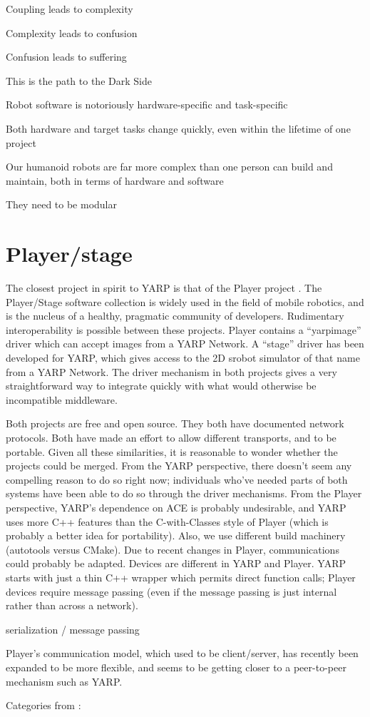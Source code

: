 Coupling leads to complexity

Complexity leads to confusion

Confusion leads to suffering

This is the path to the Dark Side

Robot software is notoriously hardware-specific and task-specific

Both hardware and target tasks change quickly, even within the
lifetime of one project

Our humanoid robots are far more complex than one person can build and
maintain, both in terms of hardware and software

They need to be modular



\section{Player/stage}

The closest project in spirit to YARP is that of the Player project
\cite{vaughan2006reusable}.  The Player/Stage software collection is 
widely used in the field of mobile robotics, and is the nucleus of
a healthy, pragmatic community of developers.  
%
Rudimentary interoperability is possible between these projects.
Player contains a ``yarpimage'' driver which can accept images
from a YARP Network.  A ``stage'' driver has been developed
for YARP, which gives access to the 2D srobot simulator of that
name from a YARP Network.
%
The driver mechanism in both projects gives a very straightforward way
to integrate quickly with what would otherwise be incompatible
middleware.

Both projects are free and open source.  They both have documented
network protocols.  Both have made an effort to allow different
transports, and to be portable.  Given all these similarities,
it is reasonable to wonder whether the projects could be merged.
%
From the YARP perspective, there doesn't seem any compelling reason to
do so right now; individuals who've needed parts of both systems have
been able to do so through the driver mechanisms.
%
From the Player perspective, YARP's dependence on ACE is probably
undesirable, and YARP uses more C++ features than the C-with-Classes
style of Player (which is probably a better idea for portability).
Also, we use different build machinery (autotools versus CMake).
%
Due to recent changes in Player, communications could probably be
adapted.  Devices are different in YARP and Player.  YARP starts
with just a thin C++ wrapper which permits direct function calls;
Player devices require message passing (even if the message passing
is just internal rather than across a network).


serialization / message passing

Player's communication model,
which used to be client/server, has recently been expanded to
be more flexible, and seems to be getting closer to a peer-to-peer
mechanism such as YARP.



Categories from \cite{collett2005player}:


